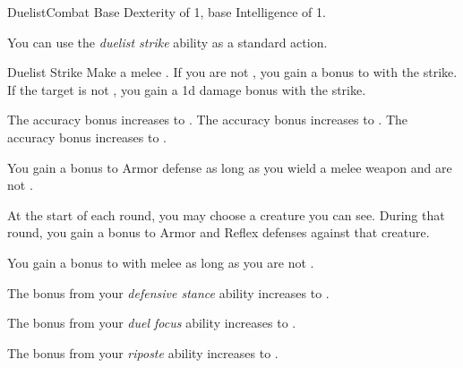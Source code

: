     \begin{feat}{Duelist}{Combat}
        \featpre Base Dexterity of 1, base Intelligence of 1.

         You can use the \textit{duelist strike} ability as a standard action.
        \begin{freeability}{Duelist Strike}
            Make a melee .
            If you are not \surrounded, you gain a  bonus to  with the strike.
            If the target is not \surrounded, you gain a \plus1d damage bonus with the strike.

            \rankline
             The accuracy bonus increases to .
             The accuracy bonus increases to .
             The accuracy bonus increases to .
        \end{freeability}

         You gain a  bonus to Armor defense as long as you wield a melee weapon and are not \surrounded.

         At the start of each round, you may choose a creature you can see.
        During that round, you gain a  bonus to Armor and Reflex defenses against that creature.

         You gain a  bonus to  with melee  as long as you are not \surrounded.

         The bonus from your \textit{defensive stance} ability increases to .

         The bonus from your \textit{duel focus} ability increases to .

         The bonus from your \textit{riposte} ability increases to .
    \end{feat}

